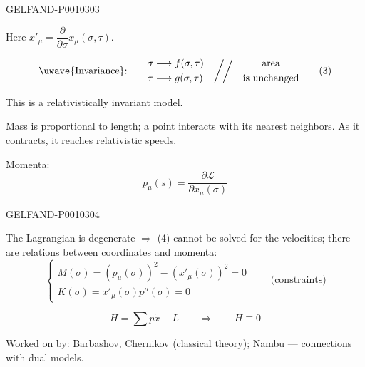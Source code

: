 \begin{GelfandAdjacentEvidence}{GELFAND-P001030}{3}


Here $x'_\mu=\dfrac{\partial}{\partial\sigma}x_\mu(\sigma,\tau)$.

\begin{equation*}
\text{\uwave{Invariance}:}\qquad
\begin{aligned}
\sigma&\longrightarrow f(\sigma,\tau)\\
\tau&\longrightarrow g(\sigma,\tau)
\end{aligned}
\quad\bigg/\!\bigg/\quad
\begin{gathered}\text{area}\\\text{is unchanged}\end{gathered}
\tag{3}
\end{equation*}

This is a relativistically invariant model.

Mass is proportional to length; a point interacts with its nearest neighbors.
As it contracts, it reaches relativistic speeds.

Momenta:
\begin{equation*}
p_\mu(s)=\frac{\partial\mathcal{L}}{\partial\dot{x}_\mu(\sigma)}
\tag{4}
\end{equation*}
\end{GelfandAdjacentEvidence}
\begin{GelfandAdjacentEvidence}{GELFAND-P001030}{4}


The Lagrangian is degenerate $\Rightarrow$ (4) cannot be solved for the velocities; there are relations between coordinates and momenta:
\begin{equation*}
\begin{cases}
M(\sigma)=(p_\mu(\sigma))^2-(x'_\mu(\sigma))^2=0\\
K(\sigma)=x'_\mu(\sigma)p^\mu(\sigma)=0
\end{cases}
\qquad\text{(constraints)}
\tag{5}
\end{equation*}
\end{GelfandAdjacentEvidence}


\begin{equation*}
H=\sum p\dot{x}-L\qquad\Rightarrow\qquad H\equiv0
\tag{6}
\end{equation*}

\underline{Worked on by}: Barbashov, Chernikov (classical theory);
Nambu --- connections with dual models.

